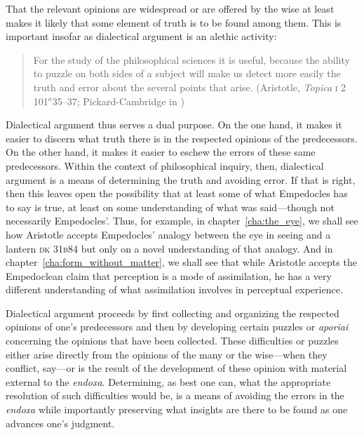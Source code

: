 That the relevant opinions are widespread or are offered by the wise at least makes it likely that some element of truth is to be found among them. This is important insofar as dialectical argument is an alethic activity:
\begin{quote}
	For the study of the philosophical sciences it is useful, because the ability to puzzle on both sides of a subject will make us detect more easily the truth and error about the several points that arise. (Aristotle, \emph{Topica} \textsc{i} 2 101\( ^{a} \)35--37; Pickard-Cambridge in \citealt[3--4]{Barnes:1984uq})
\end{quote}
Dialectical argument thus serves a dual purpose. On the one hand, it makes it easier to discern what truth there is in the respected opinions of the predecessors. On the other hand, it makes it easier to eschew the errors of these same predecessors. Within the context of philosophical inquiry, then, dialectical argument is a means of determining the truth and avoiding error. If that is right, then this leaves open the possibility that at least some of what Empedocles has to say is true, at least on some understanding of what was said---though not necessarily Empedocles'. Thus, for example, in chapter~\ref{cha:the_eye}, we shall see how Aristotle accepts Empedocles' analogy between the eye in seeing and a lantern \textsc{dk} 31\textsc{b}84 but only on a novel understanding of that analogy. And in chapter~\ref{cha:form_without_matter}, we shall see that while Aristotle accepts the Empedoclean claim that perception is a mode of assimilation, he has a very different understanding of what assimilation involves in perceptual experience.

Dialectical argument proceeds by first collecting and organizing the respected opinions of one's predecessors and then by developing certain puzzles or \emph{aporiai} concerning the opinions that have been collected. These difficulties or puzzles either arise directly from the opinions of the many or the wise---when they conflict, say---or is the result of the development of these opinion with material external to the \emph{endoxa}. Determining, as best one can, what the appropriate resolution of such difficulties would be, is a means of avoiding the errors in the \emph{endoxa} while importantly preserving what insights are there to be found as one advances one's judgment.

